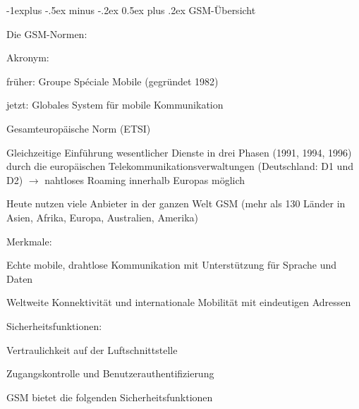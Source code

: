 \documentclass[a4paper]{article}
\makeatletter
\renewcommand{\subsection}{\@startsection{subsection}{2}{0mm}%
 {-1explus -.5ex minus -.2ex}%
 {0.5ex plus .2ex}%
 {\normalfont\normalsize\bfseries}}
\makeatother
\begin{document}
\begin{multicols}{3}
      \subsection{GSM-Übersicht}
      \begin{itemize*}
            \item Die GSM-Normen:
            \begin{itemize*}
                  \item Akronym:
                  \begin{itemize*}
                        \item früher: Groupe Spéciale Mobile (gegründet 1982)
                        \item jetzt: Globales System für mobile Kommunikation
                  \end{itemize*}
                  \item Gesamteuropäische Norm (ETSI)
                  \item Gleichzeitige Einführung wesentlicher Dienste in drei Phasen (1991, 1994, 1996) durch die europäischen Telekommunikationsverwaltungen (Deutschland: D1 und D2) $\rightarrow$ nahtloses Roaming innerhalb Europas möglich
                  \item Heute nutzen viele Anbieter in der ganzen Welt GSM (mehr als 130 Länder in Asien, Afrika, Europa, Australien, Amerika)
            \end{itemize*}
            \item Merkmale:
            \begin{itemize*}
                  \item Echte mobile, drahtlose Kommunikation mit Unterstützung für Sprache und Daten
                  \item Weltweite Konnektivität und internationale Mobilität mit eindeutigen Adressen
                  \item Sicherheitsfunktionen:
                  \begin{itemize*}
                        \item Vertraulichkeit auf der Luftschnittstelle
                        \item Zugangskontrolle und Benutzerauthentifizierung
                  \end{itemize*}
            \end{itemize*}
            \item GSM bietet die folgenden Sicherheitsfunktionen
            \begin{itemize*}

\end{itemize*}
\end{itemize*}
\end{multicols}
\end{document}
